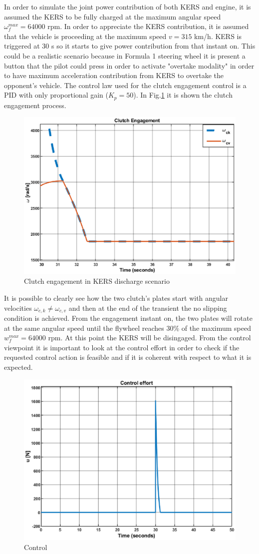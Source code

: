 \documentclass[11pt]{article}
\begin{document}
In order to simulate the joint power contribution of both KERS and engine, it is assumed the KERS to be fully charged at the maximum angular speed $ \omega_f^{max}=64000$ rpm. In order to appreciate the KERS contribution, it is assumed that the vehicle is proceeding at the maximum speed $ v = 315$ km/h. KERS is triggered at $30$ s so it starts to give power contribution from that instant on. This could be a realistic scenario because in Formula 1 steering wheel it is present a button that the pilot could press in order to activate "overtake modality" in order to have maximum acceleration contribution from KERS to overtake the opponent's vehicle. The control law used for the clutch engagement control is a PID with only proportional gain ($K_p = 50$). In Fig.\ref{fig: clutchengdis} it is shown the clutch engagement process.

\begin{figure}[H]
	\centering
	\includegraphics[width=.6\textwidth]{Images/Results_Dynamics/Discharge/Clutch_zoom.eps}
	\caption{Clutch engagement in KERS discharge scenario}
	\label{fig: clutchengdis}
\end{figure}

It is possible to clearly see how the two clutch's plates start with angular velocities $\omega_{c,k} \neq \omega_{c,v}$ and then at the end of the transient the no slipping condition is achieved. From the engagement instant on, the two plates will rotate at the same angular speed until the flywheel reaches $30\%$ of the maximum speed $w_f^{max}=64000$ rpm. At this point the KERS will be disingaged. From the control viewpoint it is important to look at the control effort in order to check if the requested control action is feasible and if it is coherent with respect to what it is expected.

\begin{figure}[H]
	\centering
	\includegraphics[width=.6\textwidth]{Images/Results_Dynamics/Discharge/Control.eps}
	\caption{Control}
	\label{fig: controldis}
\end{figure}
\end{document}
